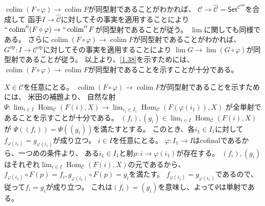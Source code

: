 \documentclass[uplatex,dvipdfmx]{jsarticle}
\makeatletter
\theoremstyle{definition}
\renewenvironment{proof}[1][\proofname]{
  \pushQED{\qed}%
  \normalfont \topsep6\p@\@plus6\p@\relax
  \trivlist
  \item[\hskip\labelsep
    #1\@addpunct{\textbf{.}}]\ignorespaces
}{%
  \popQED\endtrivlist\@endpefalse
}
\providecommand{\proofname}{証明}
\DeclareMathOperator{\Hom}{\mathrm{Hom}}
\newcommand{\op}{\mathrm{op}}
\DeclareMathOperator{\colim}{\mathrm{colim}}
\newcommand\sfSet{\mathsf{Set}}
\newcommand\mcC{\mathcal{C}}
\makeatother
\begin{document}
\begin{proof}
  \(\colim (F\circ \varphi) \to \colim F\)が同型射であることがわかれば、
  \(\mcC\to \hat{\mcC}=\sfSet^{\mcC^{\op}}\)を合成して
  函手\(I\to \hat{\mcC}\)に対してその事実を適用することにより
  \(``\colim'' (F\circ \varphi) \to ``\colim'' F\)が同型射であることが従う。
  \(\lim\)に関しても同様である。
  さらに\(\colim (F\circ \varphi) \to \colim F\)が同型射であることがわかれば、
  \(G^{\op}:I\to \mcC^{\op}\)に対してその事実を適用することにより
  \(\lim G \to \lim (G\circ \varphi)\)が同型射であることが従う。
  以上より、\autoref{1.38}を示すためには、
  \(\colim (F\circ \varphi) \to \colim F\)が同型射であることを示すことが十分である。

  \(X\in \mcC\)を任意にとる。
  \(\colim (F\circ \varphi) \to \colim F\)が同型射であることを示すためには、
  米田の補題より、
  自然な射
  \(\Psi:\lim_{i\in I}\Hom_{\mcC}(F(i),X) \to
  \lim_{i_1\in I_1}\Hom_{\mcC}(F(\varphi(i_1)),X)\)
  が全単射であることを示すことが十分である。
  \((f_i),(g_i)\in \lim_{i\in I}\Hom_{\mcC}(F(i),X)\)が
  \(\Psi((f_i)) = \Psi((g_i))\)を満たすとする。
  このとき、各\(i_1\in I_1\)に対して
  \(f_{\varphi(i_1)} = g_{\varphi(i_1)}\)が成り立つ。
  \(i\in I\)を任意にとる。
  \(\varphi:I_1\to I\)はcofinalであるから、一つめの条件より、
  ある\(i_1\in I_1\)と射\(p:i\to \varphi(i_1)\)が存在する。
  \((f_i),(g_i)\)はそれぞれ\(\lim_{i\in I}\Hom_{\mcC}(F(i),X)\)の元であるから、
  \(f_{\varphi(i_1)}\circ F(p) = f_i, g_{\varphi(i_1)} \circ F(p) = g_i\)を満たす。
  \(f_{\varphi(i_1)} = g_{\varphi(i_1)}\)であるので、
  従って\(f_i = g_i\)が成り立つ。
  これは\((f_i)=(g_i)\)を意味し、よって\(\Psi\)は単射である。


\end{proof}
\end{document}
